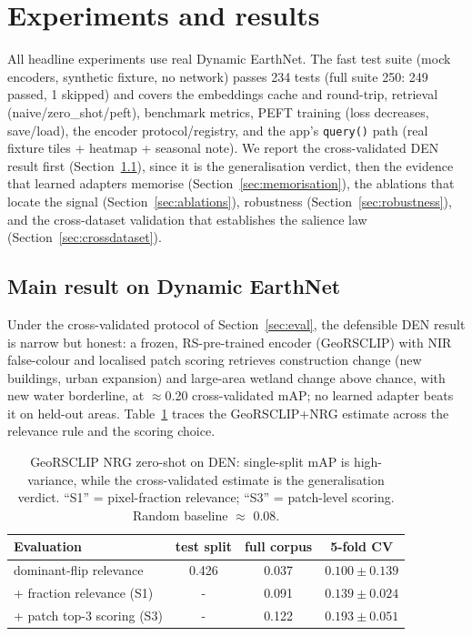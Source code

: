\documentclass{article}
\begin{document}
\section{Experiments and results}
\label{sec:results}

All headline experiments use real Dynamic EarthNet. The fast test suite (mock
encoders, synthetic fixture, no network) passes 234 tests (full suite 250: 249
passed, 1 skipped) and covers the embeddings cache and round-trip, retrieval
(naive/zero\_shot/peft), benchmark metrics, PEFT training (loss decreases,
save/load), the encoder protocol/registry, and the app's \texttt{query()} path
(real fixture tiles + heatmap + seasonal note). We report the cross-validated DEN
result first (Section~\ref{sec:denmain}), since it is the generalisation verdict,
then the evidence that learned adapters memorise (Section~\ref{sec:memorisation}),
the ablations that locate the signal (Section~\ref{sec:ablations}), robustness
(Section~\ref{sec:robustness}), and the cross-dataset validation that establishes
the salience law (Section~\ref{sec:crossdataset}).

\subsection{Main result on Dynamic EarthNet}
\label{sec:denmain}

Under the cross-validated protocol of Section~\ref{sec:eval}, the defensible DEN
result is narrow but honest: a frozen, RS-pre-trained encoder (GeoRSCLIP) with
NIR false-colour and localised patch scoring retrieves construction change (new
buildings, urban expansion) and large-area wetland change above chance, with new
water borderline, at $\approx$0.20 cross-validated mAP; no learned adapter beats
it on held-out areas. Table~\ref{tab:cv} traces the GeoRSCLIP+NRG estimate across
the relevance rule and the scoring choice.

\begin{table}[H]
    \centering
    \caption{GeoRSCLIP NRG zero-shot on DEN: single-split mAP is high-variance,
    while the cross-validated estimate is the generalisation verdict. ``S1'' =
    pixel-fraction relevance; ``S3'' = patch-level scoring. Random baseline
    $\approx$ 0.08.}
    \label{tab:cv}
    \begin{tabular}{lccc}
        \toprule
        \textbf{Evaluation} & \textbf{test split} & \textbf{full corpus} & \textbf{5-fold CV} \\
        \midrule
        dominant-flip relevance      & 0.426 & 0.037 & $0.100 \pm 0.139$ \\
        + fraction relevance (S1)    & -   & 0.091 & $0.139 \pm 0.024$ \\
        + patch top-3 scoring (S3)   & -   & 0.122 & $\mathbf{0.193 \pm 0.051}$ \\
        \bottomrule
    \end{tabular}
\end{table}
\end{document}
